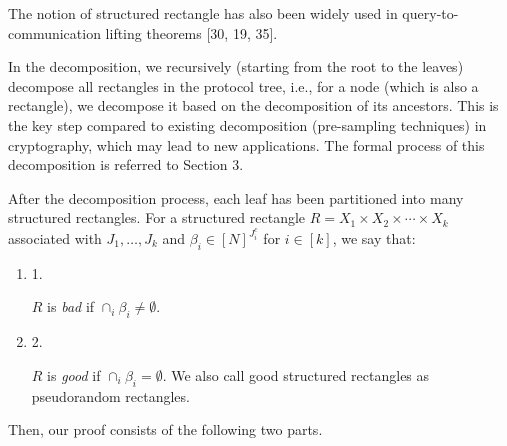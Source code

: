 


The notion of structured rectangle has also been widely used in query-to-communication lifting theorems [30, 19, 35].\par




In the decomposition, we recursively (starting from the root to the leaves) decompose all rectangles in the protocol tree, i.e., for a node (which is also a rectangle), we decompose it based on the decomposition of its ancestors. This is the key step compared to existing decomposition (pre-sampling techniques) in cryptography, which may lead to new applications. The formal process of this decomposition is referred to Section 3.\par




After the decomposition process, each leaf has been partitioned into many structured rectangles. For a structured rectangle $R=X_{1}\times X_{2}\times\cdots\times X_{k}$ associated with $J_{1},\dots,J_{k}$ and $\beta_{i}\in[N]^{J_{i}^{c}}$ for $i\in[k]$, we say that:\par


\begin{enumerate}


\item[] 
1. 


$R$ is \emph{bad} if $\cap_{i}\beta_{i}\neq\emptyset$.\par





\item[] 
2. 


$R$ is \emph{good} if $\cap_{i}\beta_{i}=\emptyset$. We also call good structured rectangles as pseudorandom rectangles.\par





\end{enumerate}


Then, our proof consists of the following two parts.\par


